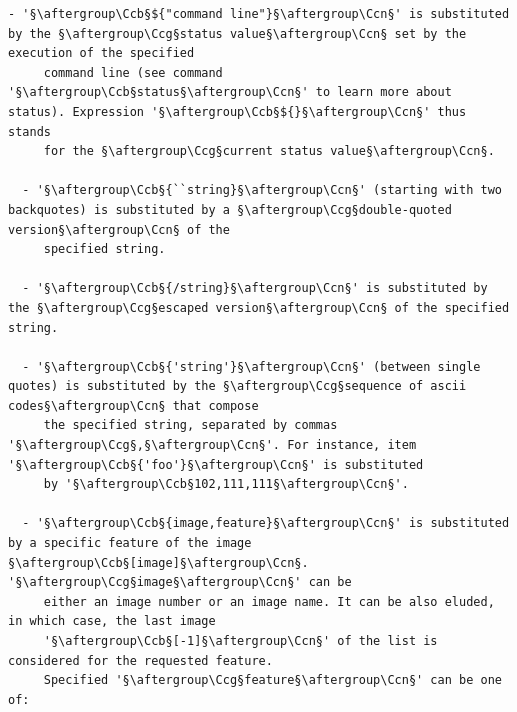 \documentclass[a4paper,10.5pt,twoside]{book}
\def\Ccb{\color{cb}}
\def\Ccg{\color{cc}}
\def\Ccn{\color{black}}
\begin{document}
\begin{lstlisting}[escapechar=§]
  - '§\aftergroup\Ccb§${"command line"}§\aftergroup\Ccn§' is substituted by the §\aftergroup\Ccg§status value§\aftergroup\Ccn§ set by the execution of the specified 
     command line (see command '§\aftergroup\Ccb§status§\aftergroup\Ccn§' to learn more about status). Expression '§\aftergroup\Ccb§${}§\aftergroup\Ccn§' thus stands 
     for the §\aftergroup\Ccg§current status value§\aftergroup\Ccn§. 
 
  - '§\aftergroup\Ccb§{``string}§\aftergroup\Ccn§' (starting with two backquotes) is substituted by a §\aftergroup\Ccg§double-quoted version§\aftergroup\Ccn§ of the 
     specified string. 
 
  - '§\aftergroup\Ccb§{/string}§\aftergroup\Ccn§' is substituted by the §\aftergroup\Ccg§escaped version§\aftergroup\Ccn§ of the specified string. 
 
  - '§\aftergroup\Ccb§{'string'}§\aftergroup\Ccn§' (between single quotes) is substituted by the §\aftergroup\Ccg§sequence of ascii codes§\aftergroup\Ccn§ that compose 
     the specified string, separated by commas '§\aftergroup\Ccg§,§\aftergroup\Ccn§'. For instance, item '§\aftergroup\Ccb§{'foo'}§\aftergroup\Ccn§' is substituted 
     by '§\aftergroup\Ccb§102,111,111§\aftergroup\Ccn§'. 
 
  - '§\aftergroup\Ccb§{image,feature}§\aftergroup\Ccn§' is substituted by a specific feature of the image §\aftergroup\Ccb§[image]§\aftergroup\Ccn§. '§\aftergroup\Ccg§image§\aftergroup\Ccn§' can be 
     either an image number or an image name. It can be also eluded, in which case, the last image 
     '§\aftergroup\Ccb§[-1]§\aftergroup\Ccn§' of the list is considered for the requested feature. 
     Specified '§\aftergroup\Ccg§feature§\aftergroup\Ccn§' can be one of: 
 

\end{lstlisting}
\end{document}
